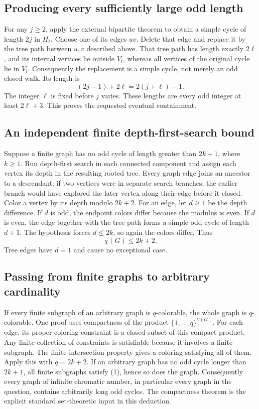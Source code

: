 \subsection*{Producing every sufficiently large odd length}
For any $j\geq2$, apply the external bipartite theorem to obtain a simple cycle of length $2j$ in $H_\ell$. Choose one of its edges $uv$. Delete that edge and replace it by the tree path between $u,v$ described above. That tree path has length exactly $2\ell$, and its internal vertices lie outside $V_i$, whereas all vertices of the original cycle lie in $V_i$. Consequently the replacement is a simple cycle, not merely an odd closed walk. Its length is
\[(2j-1)+2\ell=2(j+\ell)-1.
\]
The integer $\ell$ is fixed before $j$ varies. These lengths are every odd integer at least $2\ell+3$. This proves the requested eventual containment.

\subsection*{An independent finite depth-first-search bound}
Suppose a finite graph has no odd cycle of length greater than $2k+1$, where $k\geq1$. Run depth-first search in each connected component and assign each vertex its depth in the resulting rooted tree. Every graph edge joins an ancestor to a descendant: if two vertices were in separate search branches, the earlier branch would have explored the later vertex along their edge before it closed.
Color a vertex by its depth modulo $2k+2$. For an edge, let $d\geq1$ be the depth difference. If $d$ is odd, the endpoint colors differ because the modulus is even. If $d$ is even, the edge together with the tree path forms a simple odd cycle of length $d+1$. The hypothesis forces $d\leq2k$, so again the colors differ. Thus
\[\chi(G)\leq2k+2.\tag{1}\]
Tree edges have $d=1$ and cause no exceptional case.

\subsection*{Passing from finite graphs to arbitrary cardinality}
If every finite subgraph of an arbitrary graph is $q$-colorable, the whole graph is $q$-colorable. One proof uses compactness of the product $\{1,\ldots,q\}^{V(G)}$. For each edge, its proper-coloring constraint is a closed subset of this compact product. Any finite collection of constraints is satisfiable because it involves a finite subgraph. The finite-intersection property gives a coloring satisfying all of them.
Apply this with $q=2k+2$. If an arbitrary graph has no odd cycle longer than $2k+1$, all finite subgraphs satisfy (1), hence so does the graph. Consequently every graph of infinite chromatic number, in particular every graph in the question, contains arbitrarily long odd cycles. The compactness theorem is the explicit standard set-theoretic input in this deduction.

